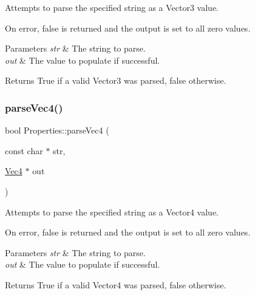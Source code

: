 Attempts to parse the specified string as a Vector3 value.

On error, false is returned and the output is set to all zero values.


\begin{DoxyParams}{Parameters}
{\em str} & The string to parse. \\
\hline
{\em out} & The value to populate if successful.\\
\hline
\end{DoxyParams}
\begin{DoxyReturn}{Returns}
True if a valid Vector3 was parsed, false otherwise. 
\end{DoxyReturn}
\mbox{\label{classProperties_a4cd5e291bfdbbcc0d04c318ce069b571}} 
\subsubsection{\texorpdfstring{parse\+Vec4()}{parseVec4()}\hspace{0.1cm}{\footnotesize\ttfamily [1/2]}}
{\footnotesize\ttfamily bool Properties\+::parse\+Vec4 (\begin{DoxyParamCaption}\item[{const char $\ast$}]{str,  }\item[{\hyperlink{classVec4}{Vec4} $\ast$}]{out }\end{DoxyParamCaption})\hspace{0.3cm}{\ttfamily [static]}}

Attempts to parse the specified string as a Vector4 value.

On error, false is returned and the output is set to all zero values.


\begin{DoxyParams}{Parameters}
{\em str} & The string to parse. \\
\hline
{\em out} & The value to populate if successful.\\
\hline
\end{DoxyParams}
\begin{DoxyReturn}{Returns}
True if a valid Vector4 was parsed, false otherwise. 
\end{DoxyReturn}
\mbox{\label{classProperties_a16375ad02554059ecabc57c5652cfe45}} 
